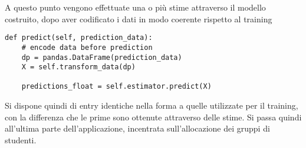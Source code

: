 A questo punto vengono effettuate una o più stime attraverso il modello costruito, dopo aver codificato i 
dati in modo coerente rispetto al training

\begin{verbatim}
def predict(self, prediction_data):
    # encode data before prediction
    dp = pandas.DataFrame(prediction_data)
    X = self.transform_data(dp)

    predictions_float = self.estimator.predict(X)
\end{verbatim} 

Si dispone quindi di entry identiche nella forma a quelle utilizzate per il training, con la 
differenza che le prime sono ottenute attraverso delle stime. Si passa quindi all'ultima parte 
dell'applicazione, incentrata sull'allocazione dei gruppi di studenti. 


